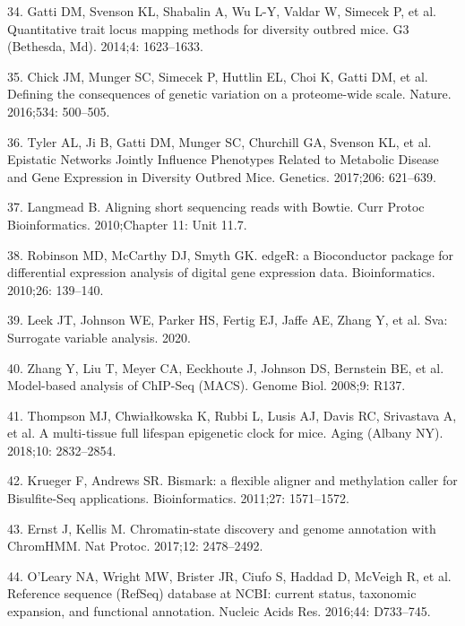 \documentclass[10pt,letterpaper]{article}
\newenvironment{cslreferences}%
  {}%
  {\par}
\begin{document}
\begin{cslreferences}
\leavevmode\hypertarget{ref-Gatti:2014ko}{}%
34. Gatti DM, Svenson KL, Shabalin A, Wu L-Y, Valdar W, Simecek P, et
al. Quantitative trait locus mapping methods for diversity outbred mice.
G3 (Bethesda, Md). 2014;4: 1623--1633.

\leavevmode\hypertarget{ref-pmid27309819}{}%
35. Chick JM, Munger SC, Simecek P, Huttlin EL, Choi K, Gatti DM, et al.
Defining the consequences of genetic variation on a proteome-wide scale.
Nature. 2016;534: 500--505.

\leavevmode\hypertarget{ref-pmid28592500}{}%
36. Tyler AL, Ji B, Gatti DM, Munger SC, Churchill GA, Svenson KL, et
al. Epistatic Networks Jointly Influence Phenotypes Related to Metabolic
Disease and Gene Expression in Diversity Outbred Mice. Genetics.
2017;206: 621--639.

\leavevmode\hypertarget{ref-pmid21154709}{}%
37. Langmead B. Aligning short sequencing reads with Bowtie. Curr Protoc
Bioinformatics. 2010;Chapter 11: Unit 11.7.

\leavevmode\hypertarget{ref-pmid19910308}{}%
38. Robinson MD, McCarthy DJ, Smyth GK. edgeR: a Bioconductor package
for differential expression analysis of digital gene expression data.
Bioinformatics. 2010;26: 139--140.

\leavevmode\hypertarget{ref-sva}{}%
39. Leek JT, Johnson WE, Parker HS, Fertig EJ, Jaffe AE, Zhang Y, et al.
Sva: Surrogate variable analysis. 2020.

\leavevmode\hypertarget{ref-pmid18798982}{}%
40. Zhang Y, Liu T, Meyer CA, Eeckhoute J, Johnson DS, Bernstein BE, et
al. Model-based analysis of ChIP-Seq (MACS). Genome Biol. 2008;9: R137.

\leavevmode\hypertarget{ref-pmid30348905}{}%
41. Thompson MJ, Chwiałkowska K, Rubbi L, Lusis AJ, Davis RC, Srivastava
A, et al. A multi-tissue full lifespan epigenetic clock for mice. Aging
(Albany NY). 2018;10: 2832--2854.

\leavevmode\hypertarget{ref-pmid21493656}{}%
42. Krueger F, Andrews SR. Bismark: a flexible aligner and methylation
caller for Bisulfite-Seq applications. Bioinformatics. 2011;27:
1571--1572.

\leavevmode\hypertarget{ref-pmid29120462}{}%
43. Ernst J, Kellis M. Chromatin-state discovery and genome annotation
with ChromHMM. Nat Protoc. 2017;12: 2478--2492.

\leavevmode\hypertarget{ref-pmid26553804}{}%
44. O'Leary NA, Wright MW, Brister JR, Ciufo S, Haddad D, McVeigh R, et
al. Reference sequence (RefSeq) database at NCBI: current status,
taxonomic expansion, and functional annotation. Nucleic Acids Res.
2016;44: D733--745.


\end{cslreferences}
\end{document}
